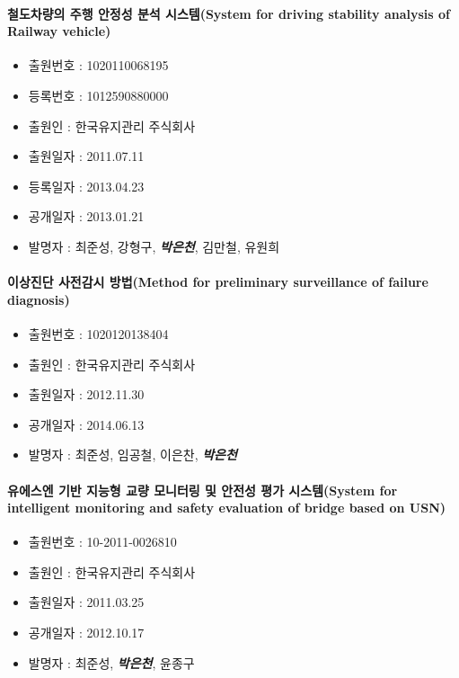 \paragraph{철도차량의 주행 안정성 분석 시스템(System for driving
stability analysis of Railway
vehicle)}

\begin{itemize}
\item[]
  출원번호 : 1020110068195
\item[]
  등록번호 : 1012590880000
\item[]
  출원인 : 한국유지관리 주식회사
\item[]
  출원일자 : 2011.07.11
\item[]
  등록일자 : 2013.04.23
\item[]
  공개일자 : 2013.01.21
\item[]
  발명자 : 최준성, 강형구, \emph{\textbf{박은천}}, 김만철, 유원희
\end{itemize}

\paragraph{이상진단 사전감시 방법(Method for preliminary surveillance of
failure
diagnosis)}

\begin{itemize}
\item[]
  출원번호 : 1020120138404
\item[]
  출원인 : 한국유지관리 주식회사
\item[]
  출원일자 : 2012.11.30
\item[]
  공개일자 : 2014.06.13
\item[]
  발명자 : 최준성, 임공철, 이은찬, \emph{\textbf{박은천}}
\end{itemize}

\paragraph{유에스엔 기반 지능형 교량 모니터링 및 안전성 평가
시스템(System for intelligent monitoring and safety evaluation of bridge
based on
USN)}

\begin{itemize}
\item[]
  출원번호 : 10-2011-0026810
\item[]
  출원인 : 한국유지관리 주식회사
\item[]
  출원일자 : 2011.03.25
\item[]
  공개일자 : 2012.10.17
\item[]
  발명자 : 최준성, \emph{\textbf{박은천}}, 윤종구
\end{itemize}

